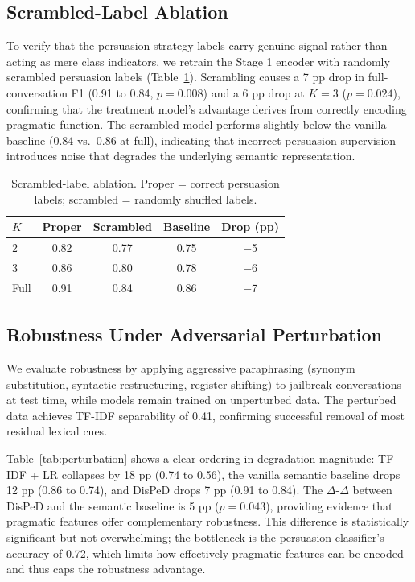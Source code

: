 \documentclass[11pt,a4paper]{article}
\begin{document}
\subsection{Scrambled-Label Ablation}
\label{sec:ablation}

To verify that the persuasion strategy labels carry genuine signal rather than acting as mere class indicators, we retrain the Stage 1 encoder with randomly scrambled persuasion labels (Table~\ref{tab:scrambled}).
Scrambling causes a 7 pp drop in full-conversation F1 (0.91 to 0.84, $p{=}0.008$) and a 6 pp drop at $K{=}3$ ($p{=}0.024$), confirming that the treatment model's advantage derives from correctly encoding pragmatic function.
The scrambled model performs slightly below the vanilla baseline (0.84 vs.\ 0.86 at full), indicating that incorrect persuasion supervision introduces noise that degrades the underlying semantic representation.

\begin{table}[t]
\centering
\small
\caption{Scrambled-label ablation. Proper = correct persuasion labels; scrambled = randomly shuffled labels.}
\label{tab:scrambled}
\begin{tabular}{lcccc}
\toprule
$K$ & \textbf{Proper} & \textbf{Scrambled} & \textbf{Baseline} & \textbf{Drop (pp)} \\
\midrule
2 & 0.82 & 0.77 & 0.75 & $-$5 \\
3 & 0.86 & 0.80 & 0.78 & $-$6 \\
Full & 0.91 & 0.84 & 0.86 & $-$7 \\
\bottomrule
\end{tabular}
\end{table}

\subsection{Robustness Under Adversarial Perturbation}
\label{sec:perturbation}

We evaluate robustness by applying aggressive paraphrasing (synonym substitution, syntactic restructuring, register shifting) to jailbreak conversations at test time, while models remain trained on unperturbed data.
The perturbed data achieves TF-IDF separability of 0.41, confirming successful removal of most residual lexical cues.

Table~\ref{tab:perturbation} shows a clear ordering in degradation magnitude: TF-IDF + LR collapses by 18 pp (0.74 to 0.56), the vanilla semantic baseline drops 12 pp (0.86 to 0.74), and DisPeD drops 7 pp (0.91 to 0.84).
The $\Delta$-$\Delta$ between DisPeD and the semantic baseline is 5 pp ($p{=}0.043$), providing evidence that pragmatic features offer complementary robustness.
This difference is statistically significant but not overwhelming; the bottleneck is the persuasion classifier's accuracy of 0.72, which limits how effectively pragmatic features can be encoded and thus caps the robustness advantage.
\end{document}

